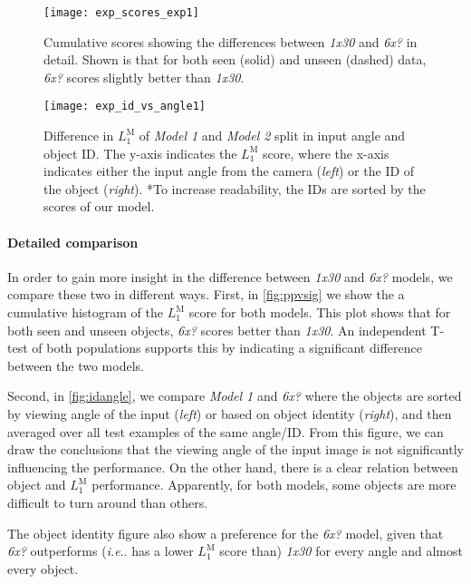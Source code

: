 \documentclass[runningheads]{llncs}
\makeatletter
\DeclareRobustCommand\onedot{\futurelet\@let@token\@onedot}
\def\@onedot{\ifx\@let@token.\else.\null\fi\xspace}
\def\ie{\emph{i.e}\onedot} \def\Ie{\emph{I.e}\onedot}
\newcommand{\myparagraph}[1]{\vspace{-2mm}\paragraph{\textbf{#1}}}
\let\wip\emph
\def\wmad{$L_1^{\textrm{M}}$\xspace}
\makeatother
\begin{document}
\begin{figure}[b]
    \centering
    \vspace{-5pt}
    \texttt{[image: exp\_scores\_exp1]}
    \vspace{-4mm}
    \caption{\small
        Cumulative scores showing the differences between \wip{1x30} and \wip{6x?} in detail.
        Shown is that for both seen (solid) and unseen (dashed) data, \wip{6x?} scores slightly better than \wip{1x30}.
    }
    \label{fig:ppvsig}
\end{figure}\begin{figure}[t] 
    \centering
    \texttt{[image: exp\_id\_vs\_angle1]}
    \vspace{-5mm}
    \caption{
        Difference in \wmad of \wip{Model 1} and \wip{Model 2} split in input angle and object ID.
        The y-axis indicates the \wmad score, where the x-axis indicates either the input angle from the camera (\emph{left}) or the ID of the object (\emph{right}).
        *To increase readability, the IDs are sorted by the scores of our model.
    }
    \label{fig:idangle}
    \vspace{-5mm}
\end{figure}\myparagraph{Detailed comparison}
In order to gain more insight in the difference between \wip{1x30} and \wip{6x?} models, we compare these two in different ways.
First, in \autoref{fig:ppvsig} we show the a cumulative histogram of the \wmad score for both models.
This plot shows that for both seen and unseen objects, \wip{6x?} scores better than \wip{1x30}.
An independent T-test of both populations supports this by indicating a significant difference between the two models. 


Second, in \autoref{fig:idangle}, we compare \wip{Model 1}  and \wip{6x?}  where the objects are sorted by viewing angle of the input (\emph{left}) or based on object identity (\emph{right}), and then averaged over all test examples of the same angle/ID.
From this figure, we can draw the conclusions that the viewing angle of the input image is not significantly influencing the performance.
On the other hand, there is a clear relation between object and \wmad performance.
Apparently, for both models, some objects are more difficult to turn around than others.

The object identity figure also show a preference for the \wip{6x?} model, given that \wip{6x?} outperforms (\ie has a lower \wmad score than) \wip{1x30} for every angle and almost every object.
\end{document}
